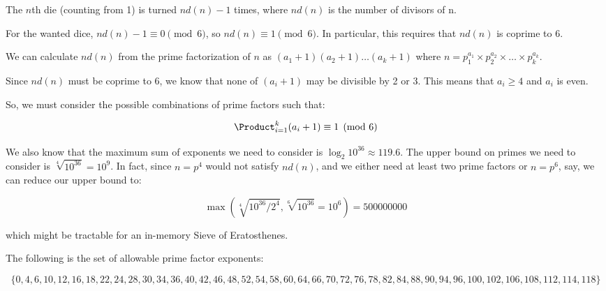 The $n$th die (counting from 1) is turned $nd(n) - 1$ times, where $nd(n)$ is
the number of divisors of n.

For the wanted dice, $nd(n) - 1 \equiv 0 \pmod{6}$, so $nd(n) \equiv 1
\pmod{6}$.  In particular, this requires that $nd(n)$ is coprime to 6.

We can calculate $nd(n)$ from the prime factorization of $n$ as $(a_1 + 1) (a_2
+ 1) \dots (a_k + 1)$ where $n = p_1^{a_1} \times p_2^{a_2} \times \dots \times
p_k^{a_k}$.

Since $nd(n)$ must be coprime to 6, we know that none of $(a_i + 1)$ may be
divisible by 2 or 3.  This means that $a_i \ge 4$ and $a_i$ is even.

So, we must consider the possible combinations of prime factors such that:

\[
\Product_{i=1}^{k} (a_i + 1) \equiv 1 \pmod{6}
\]

We also know that the maximum sum of exponents we need to consider is
$\log_2{10^{36}} \approx 119.6$.  The upper bound on primes we need to consider
is $\sqrt[4]{10^{36}} = 10^{9}$.  In fact, since $n = p^{4}$ would not satisfy
$nd(n)$, and we either need at least two prime factors or $n = p^{6}$, say, we
can reduce our upper bound to:

\[
\max(\sqrt[4]{10^{36} / 2^{4}}, \sqrt[6]{10^{36}} = 10^{6}) = 500 000 000
\]

which might be tractable for an in-memory Sieve of Eratosthenes.

The following is the set of allowable prime factor exponents:

\[
\{
0, 4, 6, 10, 12, 16, 18, 22, 24, 28, 30, 34, 36, 40, 42, 46, 48, 52, 54, 58, 60,
64, 66, 70, 72, 76, 78, 82, 84, 88, 90, 94, 96, 100, 102, 106, 108, 112, 114,
118
\}
\]
